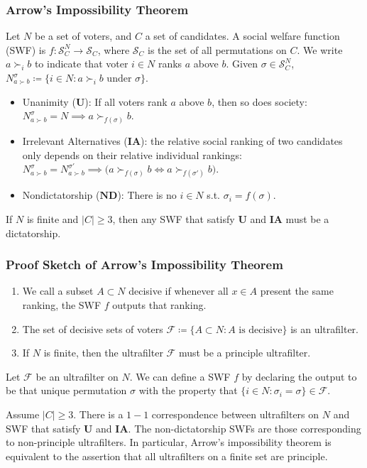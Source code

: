 \documentclass[UTF8,11pt,colorlinks,compress,openany]{beamer}%
\begin{document}
\begin{frame}\frametitle{Arrow's Impossibility Theorem}
Let $N$ be a set of voters, and $C$ a set of candidates. A social welfare function (SWF) is $f: \mathcal{S}_C^N\to \mathcal{S}_C$, where $\mathcal{S}_C$ is the set of all permutations on $C$. We write $a\succ_i b$ to indicate that voter $i\in N$ ranks $a$ above $b$. Given $\sigma\in \mathcal{S}_C^N$, $N_{a\succ b}^{\sigma}\coloneqq \{i\in N: a\succ_i b \mbox{ under } \sigma\}$.
\begin{itemize}
	\item Unanimity ($\mathbf{U}$): If all voters rank $a$ above $b$, then so does society: $N_{a\succ b}^{\sigma}=N\implies a\succ_{f(\sigma)}b$.
	\item Irrelevant Alternatives ($\mathbf{IA}$): the relative social ranking of two candidates only depends on their relative individual rankings: $N_{a\succ b}^{\sigma}=N_{a\succ b}^{\sigma'}\implies \Big(a\succ_{f(\sigma)}b\iff a\succ_{f(\sigma')}b\Big)$.
	\item Nondictatorship ($\mathbf{ND}$): There is no $i\in N$ s.t. $\sigma_i=f(\sigma)$.
\end{itemize}
\begin{theorem}
If $N$ is finite and $|C|\geq 3$, then any SWF that satisfy $\mathbf{U}$ and $\mathbf{IA}$ must be a dictatorship.
\end{theorem}
\end{frame}

\begin{frame}\frametitle{Proof Sketch of Arrow's Impossibility Theorem}
\begin{enumerate}
	\item We call a subset $A\subset N$ decisive if whenever all $x\in A$ present the same ranking, the SWF $f$ outputs that ranking.
	\item The set of decisive sets of voters $\mathcal{F}\coloneqq \{A\subset N: A \mbox{ is decisive}\}$ is an ultrafilter.
	\item If $N$ is finite, then the ultrafilter $\mathcal{F}$ must be a principle ultrafilter.
\end{enumerate}
Let $\mathcal{F}$ be an ultrafilter on $N$. We can define a SWF $f$ by declaring the output to be that unique permutation $\sigma$ with the property that $\{i\in N: \sigma_i=\sigma\}\in \mathcal{F}$.
\begin{theorem}
Assume $|C|\geq 3$. There is a $1-1$ correspondence between ultrafilters on $N$ and SWF that satisfy $\mathbf{U}$ and $\mathbf{IA}$. The non-dictatorship SWFs are those corresponding to non-principle ultrafilters. In particular, Arrow's impossibility theorem is equivalent to the assertion that all ultrafilters on a finite set are principle.
\end{theorem}
\end{frame}
\end{document}
